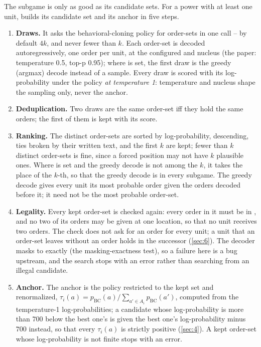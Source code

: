 \documentclass[12pt,a4paper]{article}
\begin{document}
The subgame is only as good as its candidate sets.
For a power with at least one unit,  builds its candidate set and its anchor in five steps.
\begin{enumerate}
\item \textbf{Draws.}
It asks the behavioral-cloning policy for  order-sets in one call -- by default $4k$, and never fewer than $k$.
Each order-set is decoded autoregressively, one order per unit, at the configured  and nucleus  (the paper: temperature 0.5, top-p 0.95); where  is set, the first draw is the greedy (argmax) decode instead of a sample.
Every draw is scored with its log-probability under the policy \emph{at temperature 1}: temperature and nucleus shape the sampling only, never the anchor.
\item \textbf{Deduplication.}
Two draws are the same order-set iff they hold the same orders; the first of them is kept with its score.
\item \textbf{Ranking.}
The distinct order-sets are sorted by log-probability, descending, ties broken by their written text, and the first $k$ are kept; fewer than $k$ distinct order-sets is fine, since a forced position may not have $k$ plausible ones.
Where  is set and the greedy decode is not among the $k$, it takes the place of the $k$-th, so that the greedy decode is in every subgame.
The greedy decode gives every unit its most probable order given the orders decoded before it; it need not be the most probable order-set.
\item \textbf{Legality.}
Every kept order-set is checked again: every order in it must be in , and no two of its orders may be given at one location, so that no unit receives two orders.
The check does not ask for an order for every unit; a unit that an order-set leaves without an order holds in the successor (\cref{sec:6}).
The decoder masks to  exactly (the masking-exactness test), so a failure here is a bug upstream, and the search stops with an error rather than searching from an illegal candidate.
\item \textbf{Anchor.}
The anchor is the policy restricted to the kept set and renormalized, $\tau_i(a) = p_{\mathrm{BC}}(a) / \sum_{a' \in A_i} p_{\mathrm{BC}}(a')$, computed from the temperature-1 log-probabilities; a candidate whose log-probability is more than $700$ below the best one's is given the best one's log-probability minus $700$ instead, so that every $\tau_i(a)$ is strictly positive (\cref{sec:4}).
A kept order-set whose log-probability is not finite stops  with an error.
\end{enumerate}
\end{document}
